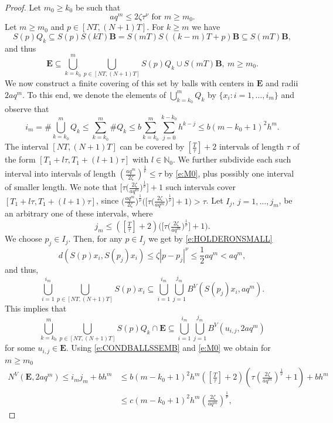 \documentclass[10pt,a4paper]{amsart}
\newcommand{\N}{\mathbb{N}}
\newcommand{\abs}[1]{\left\vert#1\right\vert}
\renewcommand{\geq}{\geqslant}
\renewcommand{\leq}{\leqslant}
\begin{document}
\begin{proof}
Let $m_0\geq k_0$ be such that
\begin{equation}\label{e:M0}
aq^{m}\leq 2\zeta\tau^{\nu}\text{ for }m\geq m_0.
\end{equation}
Let $m\geq m_0$ and $p\in[NT,(N+1)T]$. For $k\geq m$ we have
$$S(p)Q_k\subseteq S(p)S(kT)\mathbf{B}=S(mT)S((k-m)T+p)\mathbf{B}\subseteq S(mT)\mathbf{B},$$
and thus
$$\mathbf{E}\subseteq\bigcup_{k=k_0}^{m}\bigcup_{p\in[NT,(N+1)T]}S(p)Q_k\cup S(mT)\mathbf{B},\ m\geq m_0.$$
We now construct a finite covering of this set
by balls with centers in $\mathbf{E}$ and radii $2aq^{m}$. 
To this end, we denote the elements of $\displaystyle\bigcup_{k=k_0}^{m}Q_k$ by $\{x_i\colon i=1,\ldots,i_m\}$ and observe that 
$$i_{m}=\# \bigcup_{k=k_0}^{m}Q_k\leq\sum_{k=k_0}^{m}\# Q_k\leq b\sum_{k=k_0}^{m}\sum_{j=0}^{k-k_0}h^{k-j}\leq b(m-k_0+1)^{2}h^{m}.$$
The interval $[NT,(N+1)T]$ can be covered by $\left[\frac{T}{\tau}\right]+2$ intervals of length $\tau$
of the form $[T_1+l\tau,T_1+(l+1)\tau]$ with $l\in\N_0$. 
We further subdivide each such interval into intervals of length
$\left(\frac{aq^{m}}{2\zeta}\right)^{\frac{1}{\nu}}\leq \tau$ 
by \eqref{e:M0}, plus possibly one interval of smaller length. We note that 
$\Big[\tau\Big(\frac{2\zeta}{aq^{m}}\Big)^{\frac{1}{\nu}}\Big]+1$ such intervals cover 
$[T_1+l\tau,T_1+(l+1)\tau]$, since
$\Big(\frac{aq^{m}}{2\zeta}\Big)^{\frac{1}{\nu}}\Big(\Big[\tau\Big(\frac{2\zeta}{aq^{m}}\Big)^{\frac{1}{\nu}}\Big]+1\Big)>\tau$.
Let $I_j$, $j=1,\ldots, j_m$, be an arbitrary one of these intervals, where
$$j_m\leq\left(\left[\tfrac{T}{\tau}\right]+2\right)\Big(\Big[\tau\Big(\tfrac{2\zeta}{aq^{m}}\Big)^{\frac{1}{\nu}}\Big]+1\Big).$$
We choose $p_j\in I_j$. Then, for any $p\in I_j$ we get by \eqref{e:HOLDERONSMALL}
$$d(S(p)x_i,S(p_j)x_i)\leq\zeta\abs{p-p_j}^{\nu}\leq\frac{1}{2}aq^{m}<aq^{m},$$
and thus, 
$$\bigcup_{i=1}^{i_m}\bigcup_{p\in[NT,(N+1)T]}S(p)x_i\subseteq\bigcup_{i=1}^{i_m}\bigcup_{j=1}^{j_m}B^{V}(S(p_j)x_i,aq^{m}).$$
This implies that
$$\bigcup_{k=k_0}^{m}\bigcup_{p\in[NT,(N+1)T]}S(p)Q_k\cap\mathbf{E}\subseteq\bigcup_{i=1}^{i_m}\bigcup_{j=1}^{j_m}B^{V}(u_{i,j},2aq^{m})$$
for some $u_{i,j}\in\mathbf{E}$. Using \eqref{e:CONDBALLSSEMB} and \eqref{e:M0} we obtain for $m\geq m_0$
\begin{equation*}
\begin{split}
N^{V}(\mathbf{E},2aq^{m})\leq i_m j_m+bh^{m}&\leq b(m-k_0+1)^{2}h^{m}\left(\left[\tfrac{T}{\tau}\right]+2\right)\left(\tau\left(\tfrac{2\zeta}{aq^{m}}\right)^{\frac{1}{\nu}}+1\right)+bh^{m}\\
&\leq c(m-k_0+1)^{2}h^{m}\left(\tfrac{2\zeta}{aq^{m}}\right)^{\frac{1}{\nu}},

\end{split}
\end{equation*}
\end{proof}
\end{document}
